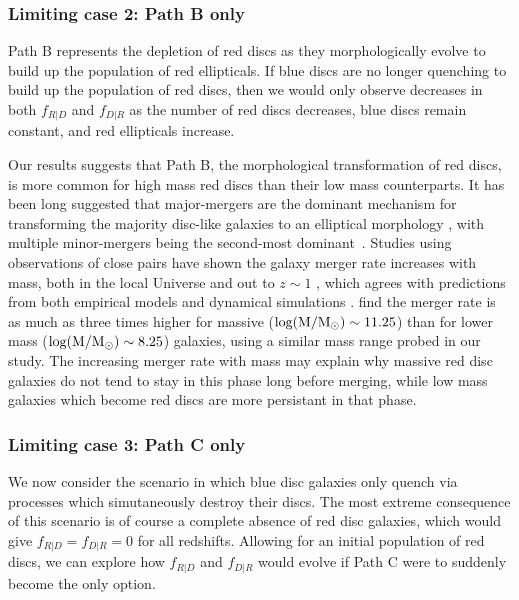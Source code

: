 \documentclass[useAMS,usenatbib]{mn2e}
\begin{document}
\subsubsection{Limiting case 2: Path B only}

Path B represents the depletion of red discs as they morphologically evolve to build up the population of red ellipticals. If blue discs are no longer quenching to build up the population of red discs, then we would only observe decreases in both $f_{R|D}$ and $f_{D|R}$ as the number of red discs decreases, blue discs remain constant, and red ellipticals increase. 

Our results suggests that Path B, the morphological transformation of red discs, is more common for high mass red discs than their low mass counterparts. It has been long suggested that major-mergers are the dominant mechanism for transforming the majority disc-like galaxies to an elliptical morphology \citep{Toomre1977,Schweizer1982,Schweizer1990}, with multiple minor-mergers being the second-most dominant~\citep{Bundy2009,Hopkins2010b}. Studies using observations of close pairs have shown the galaxy merger rate increases with mass, both in the local Universe \citep{Xu2004,Patton2008,Domingue2009,Robotham2014,Casteels2014} and out to $z\sim1$ \citep{Xu2012,Bundy2009}, which agrees with predictions from both empirical models and dynamical simulations \citep{Hopkins2010a,Hopkins2010b,Maller2006}. \citet{Casteels2014} find the merger rate is as much as three times higher for massive ($\rm log(M/M_{\odot})\sim11.25$) than for lower mass ($\rm log(M/M_{\odot})\sim8.25$) galaxies, using a similar mass range probed in our study. The increasing merger rate with mass may explain why massive red disc galaxies do not tend to stay in this phase long before merging, while low mass galaxies which become red discs are more persistant in that phase. 
 

\subsubsection{Limiting case 3: Path C only}
We now consider the scenario in which blue disc galaxies only quench via processes which simutaneously destroy their discs. The most extreme consequence of this scenario is of course a complete absence of red disc galaxies, which would give $f_{R|D}=f_{D|R}=0$ for all redshifts. Allowing for an initial population of red discs, we can explore how $f_{R|D}$ and $f_{D|R}$ would evolve if Path C were to suddenly become the only option. 
\end{document}
